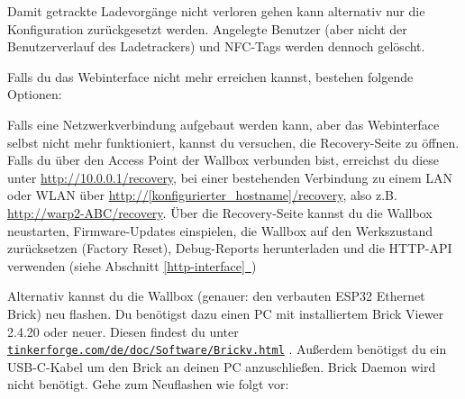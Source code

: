 \documentclass[a4paper,10pt]{article}
\newcommand*{\fullref}[1]{Abschnitt \hyperref[{#1}]{\ref*{#1}~\nameref*{#1}}}
\newcommand\rurl[2]{%
  \href{#1}{\nolinkurl{#2}}%
}
\begin{document}
\begin{multicols*}{2}
    Damit getrackte Ladevorgänge nicht verloren gehen kann alternativ nur die Konfiguration zurückgesetzt werden.
    Angelegte Benutzer (aber nicht der Benutzerverlauf des Ladetrackers) und NFC-Tags werden dennoch gelöscht.

    Falls du das Webinterface nicht mehr erreichen kannst, bestehen folgende Optionen:

    Falls eine Netzwerkverbindung aufgebaut werden kann, aber das Webinterface selbst nicht mehr funktioniert, kannst du versuchen, die Recovery-Seite zu öffnen.
    Falls du über den Access Point der Wallbox verbunden bist, erreichst du diese unter \url{http://10.0.0.1/recovery},
    bei einer bestehenden Verbindung zu einem LAN oder WLAN über \url{http://[konfigurierter_hostname]/recovery}, also z.B. \url{http://warp2-ABC/recovery}.
    Über die Recovery-Seite kannst du die Wallbox neustarten, Firmware-Updates einspielen,
    die Wallbox auf den Werkszustand zurücksetzen (Factory Reset), Debug-Reports
    herunterladen und die HTTP-API verwenden (siehe \fullref{http-interface})

    Alternativ kannst du die Wallbox (genauer: den verbauten ESP32 Ethernet
    Brick) neu flashen.
    Du benötigst dazu einen PC mit installiertem Brick Viewer 2.4.20 oder neuer. Diesen findest du unter
    \rurl{https://www.tinkerforge.com/de/doc/Software/Brickv.html}{tinkerforge.com/de/doc/Software/Brickv.html}.
    Außerdem benötigst du ein USB-C-Kabel um den Brick an deinen PC anzuschließen. Brick Daemon wird nicht benötigt.
    Gehe zum Neuflashen wie folgt vor:



\end{multicols*}
\end{document}
